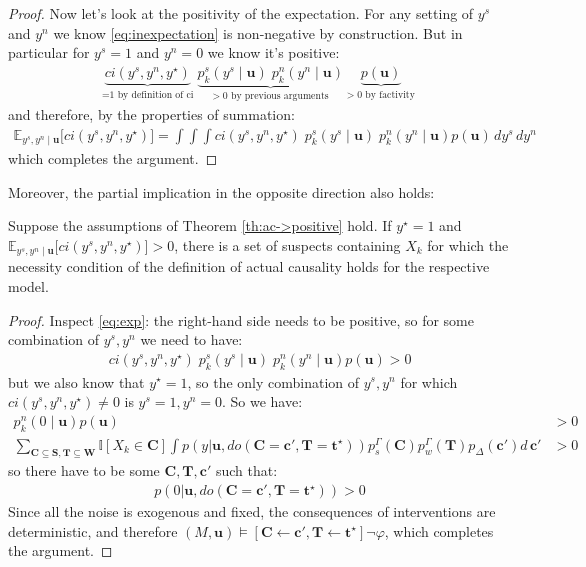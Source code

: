 \documentclass[anon,12pt]{clear2025} %
\begin{document}
\begin{proof}
Now let's look at the positivity of the expectation. For any setting of $y^s$ and $y^n$ we know \eqref{eq:inexpectation} is non-negative by construction. But in particular for $y^s = 1$ and $y^n=0$ we know it's positive:
\begin{align}\label{eq:inexpectation}
\underbrace{ci(y^s, y^n, y^\star)}_{\text{=1 by definition of ci}} \; \underbrace{p^s_k(y^s \mid \mathbf{u}) \; p^n_k(y^n \mid \mathbf{u})}_{>0 \text{ by previous arguments } } \underbrace{p(\mathbf{u})}_{>0 \text{ by factivity }}\end{align}
\noindent and therefore, by the properties of summation:
\begin{align}\label{eq:exp}
\mathbb{E}_{y^s, y^n \mid \mathbf{u}} \big[ci(y^s, y^n, y^\star) \big]
=  \int 
   \int \int ci(y^s, y^n, y^\star) \; p^s_k(y^s \mid \mathbf{u}) \; p^n_k(y^n \mid \mathbf{u}) p(\mathbf{u}) 
   \, dy^s \, dy^n  
   \end{align}
\noindent which completes the argument.
\end{proof}


Moreover, the partial implication in the opposite direction also holds:


\begin{theorem} Suppose the assumptions of Theorem \ref{th:ac->positive} hold. If $y^\star = 1$ and $\mathbb{E}_{y^s, y^n \mid \mathbf{u}} \big[ci(y^s, y^n, y^\star) \big] >0$, there is a set of suspects containing $X_k$ for which the necessity condition of the definition of actual causality holds for the respective model.
\end{theorem}


\begin{proof} Inspect \eqref{eq:exp}: the right-hand side needs to be positive, so for some combination of $y^s, y^n$ we need to have:
\begin{align*}
ci(y^s, y^n, y^\star) \; p^s_k(y^s \mid \mathbf{u}) \; p^n_k(y^n \mid \mathbf{u}) p(\mathbf{u})  > 0
\end{align*}
but we also know that $y^\star =1$, so the only combination of $y^s, y^n$ for which $ci(y^s, y^n, y^\star) \neq 0$ is $y^s =1, y^n = 0$. So we have:
\begin{align}
    p^n_k(0 \mid \mathbf{u}) p(\mathbf{u})&  >0\\
    \sum_{\mathbf{C} \subseteq \mathbf{S}, \mathbf{T}\subseteq \mathbf{W}} \mathbb{I}[X_k \in \mathbf{C}]
\int 
p(y \vert \mathbf{u}, do(\mathbf{C} = \mathbf{c'}, \mathbf{T} = \mathbf{t^\star}))
p^\Gamma_s(\mathbf{C}) p^\Gamma_w(\mathbf{T}) p_\Delta(\mathbf{c}') d\, \mathbf{c}' & > 0
\end{align}
\noindent so there have to be some $\mathbf{C, T, c'}$ such that:
\begin{align}
p(0 \vert \mathbf{u}, do(\mathbf{C} = \mathbf{c'}, \mathbf{T} = \mathbf{t^\star})) > 0
\end{align}
\noindent Since all the noise is exogenous and fixed, the consequences of interventions are deterministic, and therefore  $(M, \mathbf{u}) \vDash [\mathbf{C} \leftarrow \mathbf{c'}, \mathbf{T} \leftarrow \mathbf{t^\star}] \neg \varphi$, which completes the argument.
\end{proof}
\end{document}
